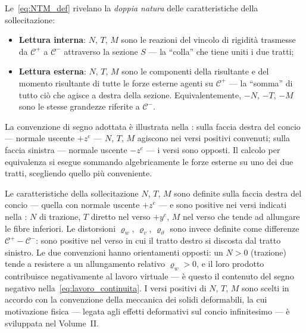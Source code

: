 Le~\eqref{eq:NTM_def} rivelano la \emph{doppia
	natura} delle caratteristiche della sollecitazione:
\begin{itemize}[nosep]
	\item \textbf{Lettura interna}: $N$, $T$, $M$
	sono le reazioni del vincolo di rigidità
	trasmesse da $\mathcal{C}^+$ a $\mathcal{C}^-$
	attraverso la sezione $S$ --- la ``colla'' che
	tiene uniti i due tratti;
	\item \textbf{Lettura esterna}: $N$, $T$, $M$
	sono le componenti della risultante e del
	momento risultante di tutte le forze esterne
	agenti su $\mathcal{C}^+$ --- la ``somma'' di
	tutto ciò che agisce a destra della sezione.
	Equivalentemente, $-N$, $-T$, $-M$ sono
	le stesse grandezze riferite a $\mathcal{C}^-$.
\end{itemize}

La convenzione di segno adottata è illustrata
nella : sulla faccia
destra del concio --- normale uscente $+z^e$ ---
$N$, $T$, $M$ agiscono nei versi positivi convenuti;
sulla faccia sinistra --- normale uscente $-z^e$
--- i versi sono opposti. Il calcolo per
equivalenza si esegue sommando algebricamente
le forze esterne su uno dei due tratti, scegliendo
quello più conveniente.






\begin{oss}
	Le caratteristiche della sollecitazione $N$, $T$, $M$
	sono definite sulla faccia destra del concio ---
	quella con normale uscente $+z^e$ --- e sono positive
	nei versi indicati nella :
	$N$ di trazione, $T$ diretto nel verso $+y^e$, $M$
	nel verso che tende ad allungare le fibre inferiori.
	Le distorsioni $\varrho_w$, $\varrho_v$,
	$\varrho_\vartheta$ sono invece definite come
	differenze $\mathcal{C}^+ - \mathcal{C}^-$: sono
	positive nel verso in cui il tratto destro si
	discosta dal tratto sinistro.
	Le due convenzioni hanno orientamenti opposti:
	un $N > 0$ (trazione) tende a resistere a un
	allungamento relativo $\varrho_w > 0$, e il loro
	prodotto contribuisce negativamente al lavoro
	virtuale --- è questo il contenuto del segno
	negativo nella~\eqref{eq:lavoro_continuita}.
	I versi positivi di $N$, $T$, $M$ sono scelti in
	accordo con la convenzione della meccanica dei
	solidi deformabili, la cui motivazione fisica ---
	legata agli effetti deformativi sul concio
	infinitesimo --- è sviluppata nel Volume~II.
\end{oss}


